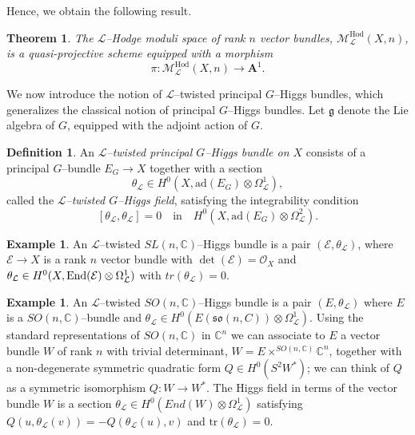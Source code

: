 \documentclass[12pt,reqno]{amsart}
\DeclareMathOperator{\End}{{\rm End}}
\numberwithin{equation}{subsection}
\newtheorem{thm}[equation]{Theorem}
\theoremstyle{definition}
\newtheorem{defn}[equation]{Definition}
\newtheorem{example}[equation]{Example}
\theoremstyle{theorem}
\begin{document}
Hence, we obtain the following result.
\begin{thm}\label{def:L-Hodge-moduli-space-for vector bundles}
	The $\mathcal{L}$--Hodge moduli space of rank $n$ vector bundles,
	$\mathcal{M}^{\mathrm{Hod}}_{\mathcal{L}}(X,n)$,
	is a quasi-projective scheme equipped with a morphism
	\[
	\pi : \mathcal{M}^{\mathrm{Hod}}_{\mathcal{L}}(X,n)
	\longrightarrow \mathbf{A}^{1}.
	\]
\end{thm}


We now introduce the notion of $\mathcal{L}$--twisted principal $G$--Higgs bundles,
which generalizes the classical notion of principal $G$--Higgs bundles.
Let $\mathfrak{g}$ denote the Lie algebra of $G$, equipped with the adjoint action of $G$.

\begin{defn}\label{def: L-twisted-principal-G-Higgs-bundles}
	An \emph{$\mathcal{L}$--twisted principal $G$--Higgs bundle on $X$} consists of a
	principal $G$--bundle $E_{G} \to X$ together with a section
	\[
	\theta_{\mathcal{L}} \in H^{0}\!\left(X,
	\text{ad}(E_{G}) \otimes \Omega^{1}_{\mathcal{L}}\right),
	\]
	called the \emph{$\mathcal{L}$--twisted $G$--Higgs field}, satisfying the integrability condition
	\[
	[\theta_{\mathcal{L}}, \theta_{\mathcal{L}}] = 0
	\quad \text{in} \quad
	H^{0}\!\left(X, \text{ad}(E_{G}) \otimes \Omega^{2}_{\mathcal{L}}\right).
	\]
\end{defn}

\begin{example}
An $\mathcal{L}$--twisted $SL(n, \mathbb{C})$--Higgs bundle is a pair $(\mathcal{E}, \theta_{\mathcal{L}})$, where $\mathcal{E} \rightarrow X$ is a rank
$n$ vector bundle with $\det(\mathcal{E}) = \mathcal{O}_{X}$ and $\theta_{\mathcal{L}} \in H^{0}(X, \End(\mathcal{E}) \otimes \Omega^{1}_{\mathcal{L}})$ with $tr(\theta_{\mathcal{L}}) = 0$.
\end{example}

\begin{example}
An $\mathcal{L}$--twisted $SO(n, \mathbb{C})$--Higgs bundle is a pair $(E, \theta_{\mathcal{L}})$ where $E$ is a $SO(n, \mathbb{C})$--bundle
and $\theta_{\mathcal{L}}\in H^{0}(E(\mathfrak{so}(n, C)) \otimes \Omega^{1}_{\mathcal{L}})$. Using the standard representations of $SO(n, \mathbb{C})$ in $\mathbb{C}^{n}$ we can associate to $E$ a vector bundle $W$ of rank $n$ with trivial determinant, $W = E\times^{SO(n,\mathbb{C})}\mathbb{C}^{n}$, together with a non-degenerate symmetric quadratic form $Q\in H^{0}(S^{2}W^{*})$; we can think
of $Q$ as a symmetric isomorphism $Q : W \rightarrow W^{*}$. The Higgs field in terms of the vector bundle $W$ is a section $\theta_{\mathcal{L}}\in H^{0}(End(W)\otimes \Omega^{1}_{\mathcal{L}})$ satisfying $Q(u, \theta_{\mathcal{L}}(v)) =
-Q(\theta_{\mathcal{L}}(u), v)$ and $\text{tr}(\theta_{\mathcal{L}}) = 0$.
\end{example}
\end{document}
